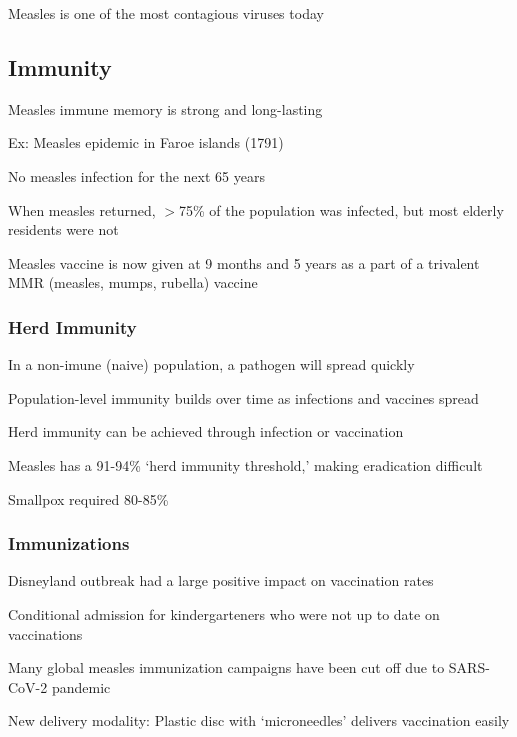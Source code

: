 \documentclass{notes}
\begin{document}
Measles is one of the most contagious viruses today


\subsection{Immunity}

Measles immune memory is strong and long-lasting

Ex: Measles epidemic in Faroe islands (1791)

\tab No measles infection for the next 65 years

\tab When measles returned, \(>\)75\% of the population was infected, but most elderly residents were not

Measles vaccine is now given at 9 months and 5 years as a part of a trivalent MMR (measles, mumps, rubella) vaccine

\subsubsection{Herd Immunity}

In a non-imune (naive) population, a pathogen will spread quickly

Population-level immunity builds over time as infections and vaccines spread

\tab Herd immunity can be achieved through infection or vaccination

Measles has a 91-94\% `herd immunity threshold,' making eradication difficult

\tab Smallpox required 80-85\%

\subsubsection{Immunizations}

Disneyland outbreak had a large positive impact on vaccination rates

\tab Conditional admission for kindergarteners who were not up to date on vaccinations

Many global measles immunization campaigns have been cut off due to SARS-CoV-2 pandemic

New delivery modality: Plastic disc with `microneedles' delivers vaccination easily
\end{document}
